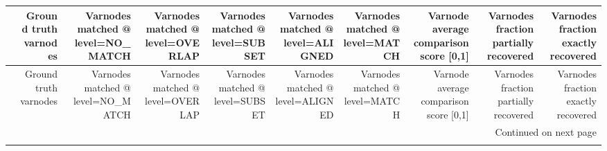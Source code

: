 \begin{longtable}{lrrrrrrrrr}
\toprule
{} &  Ground truth varnodes &  Varnodes matched @ level=NO\_MATCH &  Varnodes matched @ level=OVERLAP &  Varnodes matched @ level=SUBSET &  Varnodes matched @ level=ALIGNED &  Varnodes matched @ level=MATCH &  Varnode average comparison score {[}0,1] &  Varnodes fraction partially recovered &  Varnodes fraction exactly recovered \\
\midrule
\endfirsthead

\toprule
{} &  Ground truth varnodes &  Varnodes matched @ level=NO\_MATCH &  Varnodes matched @ level=OVERLAP &  Varnodes matched @ level=SUBSET &  Varnodes matched @ level=ALIGNED &  Varnodes matched @ level=MATCH &  Varnode average comparison score {[}0,1] &  Varnodes fraction partially recovered &  Varnodes fraction exactly recovered \\
\midrule
\endhead
\midrule
\multicolumn{10}{r}{{Continued on next page}} \\
\midrule
\endfoot


\end{longtable}
